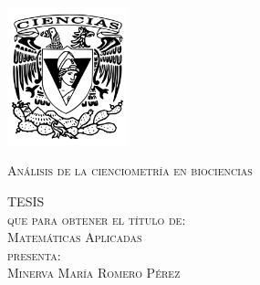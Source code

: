 \documentclass[letterpaper,12pt,oneside]{book}
\begin{document}
\begin{titlepage}
        \begin{minipage}[c][0.81\textheight][t]{0.25\textwidth}
            \vspace*{5mm}
            \begin{center}
                \hskip2.0mm
                \vrule width1pt height13cm 
                \vspace{5mm}
                \hskip2pt
                \vrule width2.5pt height13cm
                \hskip2mm
                \vrule width1pt height13cm \\
                \vspace{5mm}
                \includegraphics[height=4.0cm]{Escudo-facultad-ciencias.png}
            \end{center}
        \end{minipage}
        \begin{minipage}[c][0.81\textheight][t]{0.75\textwidth}
            \begin{center}
                \vspace{1cm}

                {\large\scshape Análisis de la cienciometría en biociencias}\\[.2in]

                \vspace{2cm}            

                \textsc{\LARGE T\hspace{.8cm}E\hspace{.8cm}S\hspace{.8cm}I\hspace{.8cm}S\hspace{.8cm}}\\[0.5cm]
                \textsc{\large que para obtener el t\'itulo de:}\\[0.5cm]
                \textsc{\large Matemáticas Aplicadas}\\[0.5cm]
                \textsc{\large presenta:}\\[0.5cm]
                \textsc{\large {Minerva María Romero Pérez}}\\[2cm]          


\end{center}
\end{minipage}
\end{titlepage}
\end{document}

